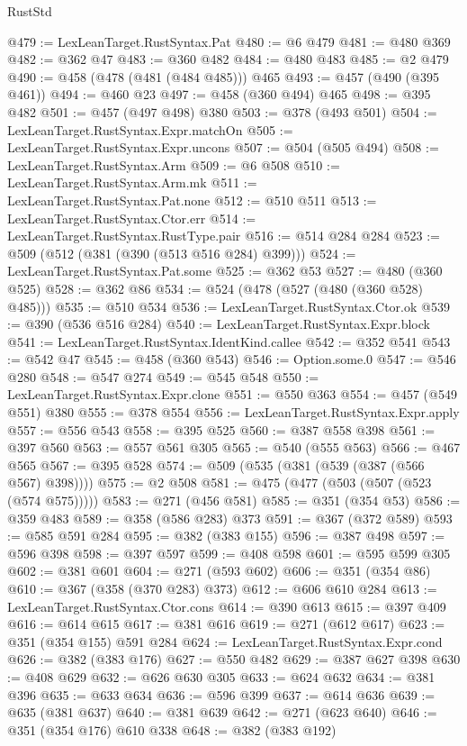 \begin{lexlean}{RustStd}
\begin{coremodule}
@479 := LexLeanTarget.RustSyntax.Pat
@480 := @6 @479
@481 := @480 @369
@482 := @362 @47
@483 := @360 @482
@484 := @480 @483
@485 := @2 @479
@490 := @458 (@478 (@481 (@484 @485))) @465
@493 := @457 (@490 (@395 @461))
@494 := @460 @23
@497 := @458 (@360 @494) @465
@498 := @395 @482
@501 := @457 (@497 @498) @380
@503 := @378 (@493 @501)
@504 := LexLeanTarget.RustSyntax.Expr.matchOn
@505 := LexLeanTarget.RustSyntax.Expr.uncons
@507 := @504 (@505 @494)
@508 := LexLeanTarget.RustSyntax.Arm
@509 := @6 @508
@510 := LexLeanTarget.RustSyntax.Arm.mk
@511 := LexLeanTarget.RustSyntax.Pat.none
@512 := @510 @511
@513 := LexLeanTarget.RustSyntax.Ctor.err
@514 := LexLeanTarget.RustSyntax.RustType.pair
@516 := @514 @284 @284
@523 := @509 (@512 (@381 (@390 (@513 @516 @284) @399)))
@524 := LexLeanTarget.RustSyntax.Pat.some
@525 := @362 @53
@527 := @480 (@360 @525)
@528 := @362 @86
@534 := @524 (@478 (@527 (@480 (@360 @528) @485)))
@535 := @510 @534
@536 := LexLeanTarget.RustSyntax.Ctor.ok
@539 := @390 (@536 @516 @284)
@540 := LexLeanTarget.RustSyntax.Expr.block
@541 := LexLeanTarget.RustSyntax.IdentKind.callee
@542 := @352 @541
@543 := @542 @47
@545 := @458 (@360 @543)
@546 := Option.some.{0}
@547 := @546 @280
@548 := @547 @274
@549 := @545 @548
@550 := LexLeanTarget.RustSyntax.Expr.clone
@551 := @550 @363
@554 := @457 (@549 @551) @380
@555 := @378 @554
@556 := LexLeanTarget.RustSyntax.Expr.apply
@557 := @556 @543
@558 := @395 @525
@560 := @387 @558 @398
@561 := @397 @560
@563 := @557 @561 @305
@565 := @540 (@555 @563)
@566 := @467 @565
@567 := @395 @528
@574 := @509 (@535 (@381 (@539 (@387 (@566 @567) @398))))
@575 := @2 @508
@581 := @475 (@477 (@503 (@507 (@523 (@574 @575)))))
@583 := @271 (@456 @581)
@585 := @351 (@354 @53)
@586 := @359 @483
@589 := @358 (@586 @283) @373
@591 := @367 (@372 @589)
@593 := @585 @591 @284
@595 := @382 (@383 @155)
@596 := @387 @498
@597 := @596 @398
@598 := @397 @597
@599 := @408 @598
@601 := @595 @599 @305
@602 := @381 @601
@604 := @271 (@593 @602)
@606 := @351 (@354 @86)
@610 := @367 (@358 (@370 @283) @373)
@612 := @606 @610 @284
@613 := LexLeanTarget.RustSyntax.Ctor.cons
@614 := @390 @613
@615 := @397 @409
@616 := @614 @615
@617 := @381 @616
@619 := @271 (@612 @617)
@623 := @351 (@354 @155) @591 @284
@624 := LexLeanTarget.RustSyntax.Expr.cond
@626 := @382 (@383 @176)
@627 := @550 @482
@629 := @387 @627 @398
@630 := @408 @629
@632 := @626 @630 @305
@633 := @624 @632
@634 := @381 @396
@635 := @633 @634
@636 := @596 @399
@637 := @614 @636
@639 := @635 (@381 @637)
@640 := @381 @639
@642 := @271 (@623 @640)
@646 := @351 (@354 @176) @610 @338
@648 := @382 (@383 @192)

\end{coremodule}
\end{lexlean}
